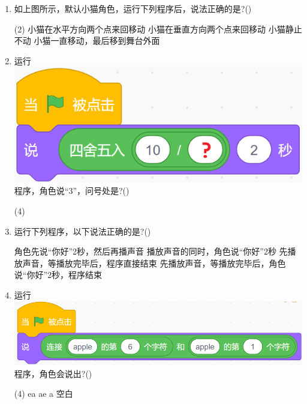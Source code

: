 \documentclass[10pt, a4paper]{article}
\begin{document}
\begin{enumerate}
        \item 如上图所示，默认小猫角色，运行下列程序后，说法正确的是?(\qquad)
        \begin{tasks}(2)
            \task 小猫在水平方向两个点来回移动
            \task 小猫在垂直方向两个点来回移动
            \task 小猫静止不动
            \task 小猫一直移动，最后移到舞台外面
        \end{tasks}

        \item 运行\includegraphics[width=.2\textwidth]{18.png}程序，角色说“3”，问号处是?(\qquad)
        \begin{tasks}(4)
        \end{tasks}

        \newpage
        \item 运行下列程序，以下说法正确的是?(\qquad)
        \begin{tasks}
            \task 角色先说“你好”2秒，然后再播声音
            \task 播放声音的同时，角色说“你好”2秒
            \task 先播放声音，等播放完毕后，程序直接结束
            \task 先播放声音，等播放完毕后，角色说“你好”2秒，程序结束
        \end{tasks}

        \item 运行\includegraphics[width=.4\textwidth]{20.png}程序，角色会说出?(\qquad)
        \begin{tasks}(4)
            \task ea
            \task ae
            \task a
            \task 空白
        \end{tasks}


\end{enumerate}
\end{document}
